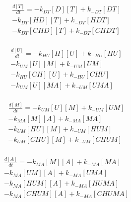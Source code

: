 \begin{equation}
\begin{split}
\frac{d[T]}{dt} =     - k_{DT}[D][T]    + k_{-DT}[DT]     \\%
                      - k_{DT}[HD][T]   + k_{-DT}[HDT]    \\%
                      - k_{DT}[CHD][T]  + k_{-DT}[CHDT]   \\%
\end{split}
\end{equation}

\begin{equation}
\begin{split}
\frac{d[U]}{dt} =     - k_{HU}[H][U]    + k_{-HU}[HU]     \\%
                      - k_{UM}[U][M]    + k_{-UM}[UM]     \\%
                      - k_{HU}[CH][U]   + k_{-HU}[CHU]    \\%
                      - k_{UM}[U][MA]   + k_{-UM}[UMA]    \\%
\end{split}
\end{equation}

\begin{equation}
\begin{split}
\frac{d[M]}{dt} =     - k_{UM}[U][M]    + k_{-UM}[UM]     \\%
                      - k_{MA}[M][A]    + k_{-MA}[MA]     \\%
                      - k_{UM}[HU][M]   + k_{-UM}[HUM]    \\%
                      - k_{UM}[CHU][M]  + k_{-UM}[CHUM]   \\%
\end{split}
\end{equation}

\begin{equation}
\begin{split}
\frac{d[A]}{dt} =     - k_{MA}[M][A]    + k_{-MA}[MA]     \\%
                      - k_{MA}[UM][A]   + k_{-MA}[UMA]    \\%
                      - k_{MA}[HUM][A]  + k_{-MA}[HUMA]   \\%
                      - k_{MA}[CHUM][A] + k_{-MA}[CHUMA]  \\%
\end{split}
\end{equation}

